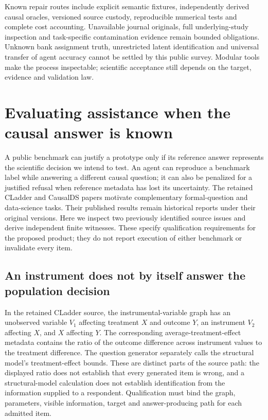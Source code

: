Known repair routes include explicit semantic fixtures, independently derived causal oracles, versioned source custody, reproducible numerical tests and complete cost accounting. Unavailable journal originals, full underlying-study inspection and task-specific contamination evidence remain bounded obligations. Unknown bank assignment truth, unrestricted latent identification and universal transfer of agent accuracy cannot be settled by this public survey. Modular tools make the process inspectable; scientific acceptance still depends on the target, evidence and validation law.~\citep{exec25_cow_reference}


\section[Independent causal and scoring oracles]{Evaluating assistance when the causal answer is known}
\label{sec:exec25-bor}

A public benchmark can justify a prototype only if its reference answer represents the scientific decision we intend to test. An agent can reproduce a benchmark label while answering a different causal question; it can also be penalized for a justified refusal when reference metadata has lost its uncertainty. The retained CLadder and CausalDS papers motivate complementary formal-question and data-science tasks. Their published results remain historical reports under their original versions. Here we inspect two previously identified source issues and derive independent finite witnesses. These specify qualification requirements for the proposed product; they do not report execution of either benchmark or invalidate every item.~\citep{v12_la_2312_04350,v12_la_2607_08093,exec25_bor_sources,exec25_bor_reference}

\subsection{An instrument does not by itself answer the population decision}

In the retained CLadder source, the instrumental-variable graph has an unobserved variable $V_1$ affecting treatment $X$ and outcome $Y$, an instrument $V_2$ affecting $X$, and $X$ affecting $Y$. The corresponding average-treatment-effect metadata contains the ratio of the outcome difference across instrument values to the treatment difference. The question generator separately calls the structural model's treatment-effect bounds. These are distinct parts of the source path: the displayed ratio does not establish that every generated item is wrong, and a structural-model calculation does not establish identification from the information supplied to a respondent. Qualification must bind the graph, parameters, visible information, target and answer-producing path for each admitted item.~\citep{exec25_bor_sources}

